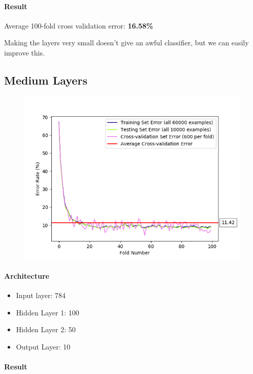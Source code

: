 \documentclass[11pt]{article}
\makeatletter
\def\maxwidth{\ifdim\Gin@nat@width>\linewidth\linewidth
    \else\Gin@nat@width\fi}
\let\Oldincludegraphics\includegraphics
\renewcommand{\includegraphics}[1]{\Oldincludegraphics[width=.8\maxwidth]{#1}}
\providecommand{\tightlist}{%
      \setlength{\itemsep}{0pt}\setlength{\parskip}{0pt}}
\makeatother
\begin{document}
\paragraph{Result}\label{result}

Average 100-fold cross validation error: \textbf{16.58\%}

Making the layers very small doesn't give an awful classifier, but we
can easily improve this.

\pagebreak

\subsection{Medium Layers}\label{medium-layers}

\begin{figure}[htbp]
\centering
\includegraphics{plots/ff-layersize-100-50.png}
\end{figure}

\paragraph{Architecture}\label{architecture-1}

\begin{itemize}
\tightlist
\item
  Input layer: 784
\item
  Hidden Layer 1: 100
\item
  Hidden Layer 2: 50
\item
  Output Layer: 10
\end{itemize}

\paragraph{Result}\label{result-1}
\end{document}
